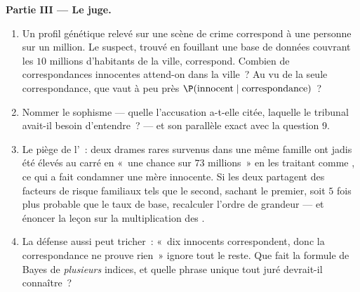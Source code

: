 \begin{problem}
\medskip
\noindent\textbf{Partie III --- Le juge.}
\begin{enumerate}[resume]
  \item Un profil génétique relevé sur une scène de crime
        correspond à une personne sur un million. Le suspect,
        trouvé en fouillant une base de données couvrant les $10$
        millions d'habitants de la ville, correspond. Combien de
        correspondances innocentes attend-on dans la ville~? Au vu
        de la seule correspondance, que vaut à peu près
        $\P(\text{innocent} \mid \text{correspondance})$~?
  \item Nommer le sophisme --- quelle  l'accusation
        a-t-elle citée, laquelle le tribunal avait-il besoin
        d'entendre~? --- et son parallèle exact avec la question 9.
  \item Le piège de l'~: deux drames rares survenus
        dans une même famille ont jadis été élevés au carré en
        «~une chance sur $73$ millions~» en les traitant comme
        , ce qui a fait condamner une mère innocente. Si
        les deux  partagent des facteurs de risque
        familiaux tels que le second, sachant le premier, soit $5$
        fois plus probable que le taux de base, recalculer l'ordre
        de grandeur --- et énoncer la leçon sur la multiplication
        des .
  \item La défense aussi peut tricher~: «~dix innocents
        correspondent, donc la correspondance ne prouve rien~»
        ignore tout le reste. Que fait la formule de Bayes de
        \emph{plusieurs} indices, et quelle phrase unique tout juré
        devrait-il connaître~?
\end{enumerate}


\end{problem}
